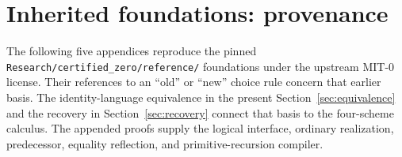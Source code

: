 \documentclass[11pt]{article}
\theoremstyle{definition}
\begin{document}
\clearpage
\section*{Inherited foundations: provenance}
The following five appendices reproduce the pinned
\nolinkurl{Research/certified_zero/reference/} foundations under the upstream
MIT-0 license. Their references to an ``old'' or ``new'' choice rule concern
that earlier basis. The identity-language equivalence in the present
Section~\ref{sec:equivalence} and the recovery in
Section~\ref{sec:recovery} connect that basis to the four-scheme calculus.
The appended proofs supply the logical interface, ordinary realization,
predecessor, equality reflection, and primitive-recursion compiler.

\end{document}
